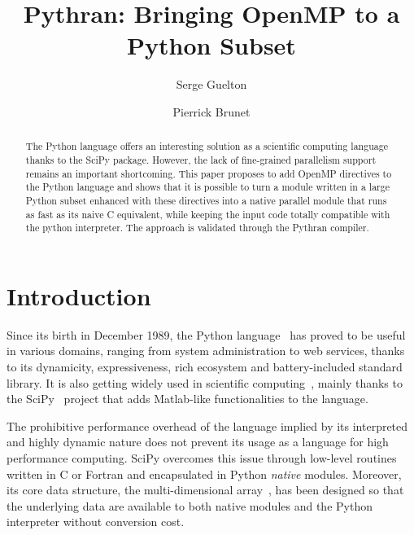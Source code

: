 \documentclass{llncs}
\begin{document}
\renewcommand{\thelstlisting}{\arabic{lstlisting}}
%
\title{Pythran: Bringing OpenMP to a Python Subset}

\author{Serge Guelton \and Pierrick Brunet}


\maketitle

%
\begin{abstract}

    The Python language offers an interesting solution as a scientific
    computing language thanks to the SciPy package. However, the lack of
    fine-grained parallelism support remains an important shortcoming. This
    paper proposes to add OpenMP directives to the Python language and shows
    that it is possible to turn a module written in a large Python subset
    enhanced with these directives into a native parallel module that runs as
    fast as its naive C equivalent, while keeping the input code totally
    compatible with the python interpreter. The approach is validated through
    the Pythran compiler.

\end{abstract}

%
\section{Introduction}

Since its birth in December 1989, the Python language~\cite{rossum97} has proved
to be useful in various domains, ranging from system administration to web
services, thanks to its dynamicity, expressiveness, rich ecosystem and
battery-included standard library. It is also getting widely used in scientific
computing~\cite{Oliphant2007}, mainly thanks to the SciPy~\cite{scipy} project
that adds Matlab-like functionalities to the language.

The prohibitive performance overhead of the language implied by its interpreted
and highly dynamic nature does not prevent its usage as a language for high
performance computing. SciPy overcomes this issue through low-level routines
written in C or Fortran and encapsulated in Python \emph{native} modules.
Moreover, its core data structure, the multi-dimensional
array~\cite{numpyarray2011}, has been designed so that the underlying data are
available to both native modules and the Python interpreter without conversion
cost.
\end{document}
